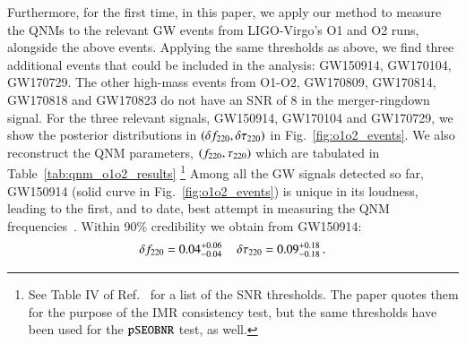 Furthermore, for the first time, in this paper, we apply our method to
measure the QNMs to the relevant
GW events from LIGO-Virgo's O1 and O2 runs, alongside
the above events. Applying the same thresholds as above, we find three
additional events that could be included in the analysis: GW150914,
GW170104, GW170729. The other high-mass events from O1-O2, GW170809,
GW170814, GW170818 and GW170823 do not have an SNR of $8$ in the
merger-ringdown signal. For the three relevant signals, GW150914,
GW170104 and GW170729, we show the posterior distributions in
$(\delta f_{\text{220}}, \delta \tau_{\text{220}})$ in Fig.~\ref{fig:o1o2_events}. We also reconstruct the QNM parameters, $(f_{\text{220}}, \tau_{\text{220}})$
which are tabulated in Table~\ref{tab:qnm_o1o2_results} \footnote{See
  Table IV of Ref.~\cite{Abbott:2020jks} for a list of the SNR
  thresholds. The paper quotes them for the purpose of the IMR
  consistency test, but the same thresholds have been used for the
  $\texttt{pSEOBNR}$ test, as well.} Among all the GW signals detected so far,
GW150914 (solid curve in Fig.~\ref{fig:o1o2_events}) is unique in its
loudness, leading to the first, and to date, best attempt in measuring the QNM frequencies~\cite{LSC_2016grtests,Brito:2018rfr,Carullo:2019flw,Isi:2019aib}. Within 90\% credibility we obtain from GW150914: 
%
\begin{equation}
\delta f_{\text{220}}=0.04^{+0.06}_{-0.04}\,\quad \delta \tau_{\text{220}}=0.09^{+0.18}_{-0.18}\,.
\end{equation}



